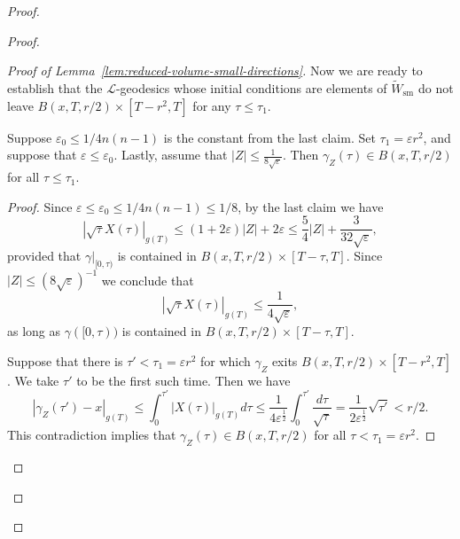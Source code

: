 \begin{proof}
\begin{proof}
\begin{proof}[Proof of Lemma~\ref{lem:reduced-volume-small-directions}]
Now we are ready to establish that the ${\mathcal L}$-geodesics
whose initial conditions are elements of $\widetilde W_{\mathrm{sm}}$ do
not leave $B(x,T,r/2)\times [T-r^2,T]$ for any  $\tau\le\tau_1$.

\begin{claim}\label{claim:l-geodesic-stays-in-ball}
\label{inside}
Suppose $\varepsilon_0\le 1/4n(n-1)$ is the constant from the last
claim. Set $\tau_1=\varepsilon r^2$, and suppose that
$\varepsilon\le \varepsilon_0$. Lastly, assume that $|Z|\le
\frac{1}{8\sqrt{\varepsilon}}$. Then $\gamma_Z(\tau) \in B(x,T,r/2)$
for all $\tau\le \tau_1$.
\end{claim}

\begin{proof}
Since $\varepsilon\le \varepsilon_0\le 1/4n(n-1)\le 1/8$, by the
last claim we have
$$|\sqrt{\tau}X(\tau)|_{g(T)}\le (1+2\varepsilon )|Z|+2\varepsilon\le
\frac{5}{4}|Z|+\frac{3}{32\sqrt\varepsilon},$$ provided that
$\gamma|_{[0,\tau)}$ is contained in $B(x,T,r/2)\times [T-\tau,T]$.
Since $|Z|\le (8\sqrt\varepsilon)^{-1}$ we conclude that
$$|\sqrt{\tau}X(\tau)|_{g(T)}\le \frac{1}{4\sqrt\varepsilon},$$
as long as $\gamma([0,\tau))$ is contained in $B(x,T,r/2)\times
[T-\tau,T]$.

 Suppose that there is
$\tau'<\tau_1=\varepsilon r^2$ for which $\gamma_Z$ exits
$B(x,T,r/2)\times [T-r^2,T]$. We take $\tau'$ to be the first such
time. Then we have
$$
|\gamma_Z(\tau')- x|_{g(T)} \leq
\int_{0}^{\tau'}|X(\tau)|_{g(T)}d\tau \le
\frac{1}{4\varepsilon^{\frac{1}{2}}}\int_{0}^{\tau'}\frac{d\tau}{\sqrt{\tau}}
=\frac{1}{2\varepsilon^{\frac{1}{2}}}\sqrt{\tau'} < r/2.
$$
This contradiction implies that  $\gamma_Z(\tau) \in B(x,T,r/2)$ for
all $\tau< \tau_1=\varepsilon r^2$.
\end{proof}





\end{proof}
\end{proof}
\end{proof}
